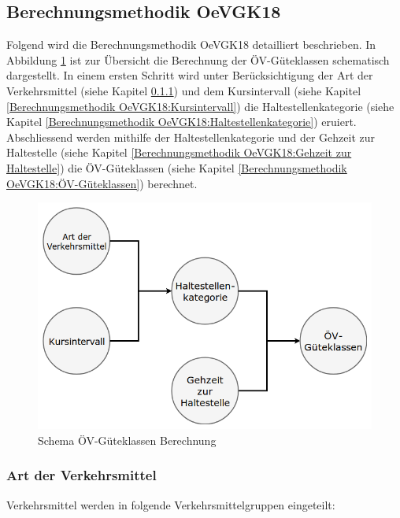 \subsection{Berechnungsmethodik OeVGK18}
\label{Berechnungsmethodik OeVGK18}
Folgend wird die Berechnungsmethodik \gls{OeVGK18} detailliert beschrieben.
In Abbildung \ref{fig:Flow_OeVGK_Brechnung} ist zur Übersicht die Berechnung der \gls{ÖV-Güteklassen} schematisch dargestellt.
In einem ersten Schritt wird unter Berücksichtigung der Art der Verkehrsmittel (siehe Kapitel \ref{Berechnungsmethodik OeVGK18:Art der Verkehrsmittel}) und dem Kursintervall (siehe Kapitel \ref{Berechnungsmethodik OeVGK18:Kursintervall}) die Haltestellenkategorie (siehe Kapitel \ref{Berechnungsmethodik OeVGK18:Haltestellenkategorie}) eruiert.
Abschliessend werden mithilfe der Haltestellenkategorie und der Gehzeit zur \gls{Haltestelle} (siehe Kapitel \ref{Berechnungsmethodik OeVGK18:Gehzeit zur Haltestelle}) die ÖV-Güteklassen (siehe Kapitel \ref{Berechnungsmethodik OeVGK18:ÖV-Güteklassen}) berechnet.

\begin{figure}[ht]
    \centering
    \includegraphics[width=0.7\linewidth]{technicalreport/img/Flow_OeVGK_Brechnung}
    \caption[Schema ÖV-Güteklassen Berechnung]{Schema ÖV-Güteklassen Berechnung}
    \label{fig:Flow_OeVGK_Brechnung}
\end{figure}

\subsubsection{Art der Verkehrsmittel}
\label{Berechnungsmethodik OeVGK18:Art der Verkehrsmittel}
Verkehrsmittel werden in folgende Verkehrsmittelgruppen eingeteilt:

